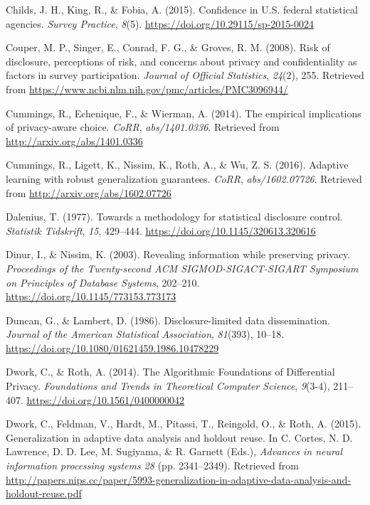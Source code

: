 \documentclass[]{article}
\begin{document}
\hypertarget{ref-Childs:Confidence:SP:2015}{}
Childs, J. H., King, R., \& Fobia, A. (2015). Confidence in U.S. federal
statistical agencies. \emph{Survey Practice}, \emph{8}(5).
\url{https://doi.org/10.29115/sp-2015-0024}

\hypertarget{ref-couper2008risk}{}
Couper, M. P., Singer, E., Conrad, F. G., \& Groves, R. M. (2008). Risk
of disclosure, perceptions of risk, and concerns about privacy and
confidentiality as factors in survey participation. \emph{Journal of
Official Statistics}, \emph{24}(2), 255. Retrieved from
\url{https://www.ncbi.nlm.nih.gov/pmc/articles/PMC3096944/}

\hypertarget{ref-cummings:empirical:corr:2014}{}
Cummings, R., Echenique, F., \& Wierman, A. (2014). The empirical
implications of privacy-aware choice. \emph{CoRR}, \emph{abs/1401.0336}.
Retrieved from \url{http://arxiv.org/abs/1401.0336}

\hypertarget{ref-cummings:adaptive:corr:2016}{}
Cummings, R., Ligett, K., Nissim, K., Roth, A., \& Wu, Z. S. (2016).
Adaptive learning with robust generalization guarantees. \emph{CoRR},
\emph{abs/1602.07726}. Retrieved from
\url{http://arxiv.org/abs/1602.07726}

\hypertarget{ref-Dalenius:Towards:1977}{}
Dalenius, T. (1977). Towards a methodology for statistical disclosure
control. \emph{Statistik Tidskrift}, \emph{15}, 429--444.
\url{https://doi.org/10.1145/320613.320616}

\hypertarget{ref-Dinur:2003:RIW:773153.773173}{}
Dinur, I., \& Nissim, K. (2003). Revealing information while preserving
privacy. \emph{Proceedings of the Twenty-second ACM SIGMOD-SIGACT-SIGART
Symposium on Principles of Database Systems}, 202--210.
\url{https://doi.org/10.1145/773153.773173}

\hypertarget{ref-Duncan:Lambert:1986}{}
Duncan, G., \& Lambert, D. (1986). Disclosure-limited data
dissemination. \emph{Journal of the American Statistical Association},
\emph{81}(393), 10--18.
\url{https://doi.org/10.1080/01621459.1986.10478229}

\hypertarget{ref-Dwork:Roth:journal:version:2014}{}
Dwork, C., \& Roth, A. (2014). The Algorithmic Foundations of
Differential Privacy. \emph{Foundations and Trends in Theoretical
Computer Science}, \emph{9}(3-4), 211--407.
\url{https://doi.org/10.1561/0400000042}

\hypertarget{ref-Dwork:Generalization:NIPS:2015}{}
Dwork, C., Feldman, V., Hardt, M., Pitassi, T., Reingold, O., \& Roth,
A. (2015). Generalization in adaptive data analysis and holdout reuse.
In C. Cortes, N. D. Lawrence, D. D. Lee, M. Sugiyama, \& R. Garnett
(Eds.), \emph{Advances in neural information processing systems 28} (pp.
2341--2349). Retrieved from
\url{http://papers.nips.cc/paper/5993-generalization-in-adaptive-data-analysis-and-holdout-reuse.pdf}
\end{document}
